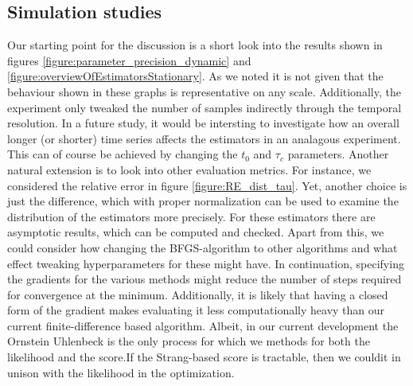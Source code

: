 \subsection{Simulation studies}
Our starting point for the discussion is a short look into the results shown in figures \ref{figure:parameter_precision_dynamic} and \ref{figure:overviewOfEstimatorsStationary}. As we noted it is not given that the behaviour shown in these graphs is representative on any scale. Additionally, the experiment only tweaked the number of samples indirectly through the temporal resolution. In a future study, it would be intersting to investigate how an overall longer (or shorter) time series affects the estimators in an analagous experiment. This can of course be achieved by changing the $t_0$ and $\tau_c$ parameters. Another natural extension is to look into other evaluation metrics. For instance, we considered the relative error in figure \ref{figure:RE_dist_tau}. Yet, another choice is just the difference, which with proper normalization can be used to examine the distribution of the estimators more precisely. For these estimators there are asymptotic results, which can be computed and checked. Apart from this, we could consider how changing the BFGS-algorithm to other algorithms and what effect tweaking hyperparameters for these might have. In continuation, specifying the gradients for the various methods might reduce the number of steps required for convergence at the minimum. Additionally, it is likely that having a closed form of the gradient makes evaluating it less computationally heavy than our current finite-difference based algorithm. Albeit, in our current development the Ornstein Uhlenbeck is the only process for which we methods for both the likelihood and the score.If the Strang-based score is tractable, then we couldit in unison with the likelihood in the optimization.\\
